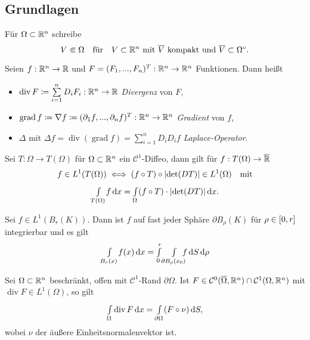 \documentclass{cheat-sheet}
\DeclareMathOperator{\grad}{grad} %
\DeclareMathOperator{\dive}{div} %
\begin{document}

\subsection{Grundlagen}

\begin{nota}
  Für $\Omega \subset \mathbb{R}^n$ schreibe
  \[
    V \Subset \Omega
    \quad \text{für} \quad
    \text{$V \subset \mathbb{R}^n$ mit $\overline{V}$ kompakt und $\overline{V} \subset \Omega^{\circ} $.}
  \]
\end{nota}

\begin{nota}
  Seien $f : \mathbb{R}^n \to \mathbb{R}$ und $F = (F_1, ..., F_n)^T : \mathbb{R}^n \to \mathbb{R}^n$ Funktionen. Dann heißt
  \begin{itemize}
    \item $\dive F \coloneqq \sum_{i=1}^n D_i F_i : \R^n \to \R$ \emph{Divergenz} von $F$,
    \item $\grad f \coloneqq \nabla f \coloneqq (\partial_1 f, ..., \partial_n f)^T : \R^n \to \R^n$ \emph{Gradient} von $f$,
    \item $\Delta$ mit $\Delta f = \dive (\grad f) = \sum_{i=1}^n D_i D_i f$ \emph{Laplace-Operator}.
  \end{itemize}
\end{nota}


\begin{satz}[Transformationssatz]
  Sei $T : \Omega \to T(\Omega)$ für $\Omega \subset \mathbb{R}^n$ ein $\mathcal{C}^1$-Diffeo, dann gilt für $f : T(\Omega) \to \overline{\mathbb{R}}$
  \[ f \in L^1(T(\Omega)) \iff (f \circ T) \circ \lvert\det(DT)\rvert \in L^1(\Omega) \quad \text{mit} \]
  \[ {\textstyle \int\limits_{T(\Omega)}^{}} f \,\mathrm{d} x = {\textstyle \int\limits_{\Omega}^{}} (f \circ T) \cdot \lvert\det(DT)\rvert \,\mathrm{d} x. \]
\end{satz}

\begin{bsp}[Polarkoordinaten]
  Sei $f \in L^1(B_r(K))$. Dann ist $f$ auf fast jeder Sphäre $\partial B_\rho(K)$ für $\rho \in \left[ 0, r \right]$ integrierbar und es gilt
  \[ {\textstyle \int\limits_{B_r(x)}^{}} f(x) \,\mathrm{d} x = {\textstyle \int\limits_{0}^{r}} {\textstyle \int\limits_{\partial B_\rho(x_0)}^{}} \!\!\!f \,\mathrm{d} S \,\mathrm{d} \rho \] %
\end{bsp}

\begin{satz}[Gauß]
  Sei $\Omega \subset \mathbb{R}^n$ beschränkt, offen mit $\mathcal{C}^1$-Rand $\partial \Omega$. Ist $F \in \mathcal{C}^0(\overline{\Omega}, \mathbb{R}^n) \cap \mathcal{C}^1(\Omega, \mathbb{R}^n)$ mit $\dive F \in L^1(\Omega)$, so gilt
  \[ \Int{\Omega}{}{\dive F}{x} = \Int{\partial \Omega}{}{(F \circ \nu)}{S}, \]
  wobei $\nu$ der äußere Einheitsnormalenvektor ist.
\end{satz}
\end{document}
